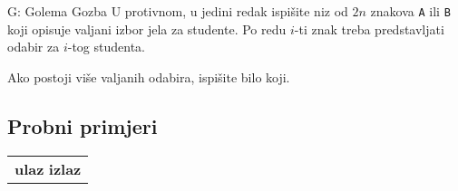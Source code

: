 \begin{statement}[
  timelimit=2 s,
  memorylimit=512 MiB,
]{G: Golema Gozba}
U protivnom, u jedini redak ispišite niz od $2n$ znakova \texttt{A} ili
\texttt{B} koji opisuje valjani izbor jela za studente. Po redu $i$-ti znak
treba predstavljati odabir za $i$-tog studenta.

Ako postoji više valjanih odabira, ispišite bilo koji.

\subsection*{Probni primjeri}
\begin{tabularx}{\textwidth}{X}
  \textbf{ulaz}
  \linespread{1}{}
  \textbf{izlaz}
  \linespread{1}{}
\end{tabularx}

\end{statement}

